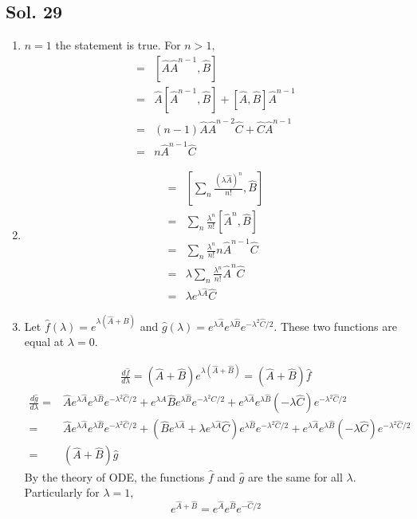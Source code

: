 \subsection*{Sol. 29}
\begin{enumerate}
    \item $n=1$ the statement is true. For $n>1,$
    \begin{align*}
        [\hat{A}^n, \hat{B}]
        =& 
        [\hat{A}\hat{A}^{n-1}, \hat{B}]\\
        =& \hat{A}[\hat{A}^{n-1}, \hat{B}] + [\hat{A}, \hat{B}]\hat{A}^{n-1}\\
        =&(n-1)\hat{A}\hat{A}^{n-2}\hat{C}
        +\hat{C}\hat{A}^{n-1}\\
        =&n\hat{A}^{n-1}\hat{C}
    \end{align*}
    \item 
    \begin{align*}
        [e^{\lambda\hat{A}},\hat{B}]
        =& \left[\sum_n\frac{(\lambda\hat{A})^n}{n!}, \hat{B}\right]\\
        =& \sum_n\frac{\lambda^n}{n!}\left[\hat{A}^n, \hat{B}\right]\\
        =&
        \sum_n\frac{\lambda^n}{n!}n\hat{A}^{n-1}\hat{C}\\
        =&\lambda\sum_n\frac{\lambda^n}{n!}\hat{A}^n\hat{C}\\
        =&\lambda e^{\lambda\hat{A}}\hat{C}
    \end{align*}
    \item 
    Let $\hat{f}(\lambda)=e^{\lambda(\hat{A}+\hat{B})}$ and 
    $\hat{g}(\lambda)=e^{\lambda\hat{A}}e^{\lambda\hat{B}}e^{-\lambda^2\hat{C}/2}.$ These two functions are equal at $\lambda=0.$

    \begin{align*}
        \frac{d\hat{f}}{d\lambda}
        =(\hat{A}+\hat{B})e^{\lambda(\hat{A}+\hat{B})}=(\hat{A}+\hat{B})\hat{f}
    \end{align*}
    \begin{align*}
        \frac{d\hat{g}}{d\lambda}
        =&\hat{A}e^{\lambda\hat{A}}e^{\lambda\hat{B}}e^{-\lambda^2\hat{C}/2}+
        e^{\lambda\hat{A}}
        \hat{B}
        e^{\lambda\hat{B}}e^{-\lambda^2\hat{C}/2}+
        e^{\lambda\hat{A}}e^{\lambda\hat{B}}
        (-\lambda\hat{C})
        e^{-\lambda^2\hat{C}/2}\\
        =&\hat{A}e^{\lambda\hat{A}}e^{\lambda\hat{B}}e^{-\lambda^2\hat{C}/2}+
        (\hat{B}e^{\lambda\hat{A}}+\lambda e^{\lambda\hat{A}}\hat{C})
        e^{\lambda\hat{B}}e^{-\lambda^2\hat{C}/2}+
        e^{\lambda\hat{A}}e^{\lambda\hat{B}}
        (-\lambda\hat{C})
        e^{-\lambda^2\hat{C}/2}\\
        =&(\hat{A}+\hat{B})\hat{g}
    \end{align*}
    By the theory of ODE, the functions $\hat{f}$ and $\hat{g}$ are the same for all $\lambda.$ Particularly for $\lambda=1,$
    $$
    e^{\hat{A}+\hat{B}} = 
    e^{\hat{A}}
    e^{\hat{B}}
    e^{-\hat{C}/2}
    $$
    
\end{enumerate}
